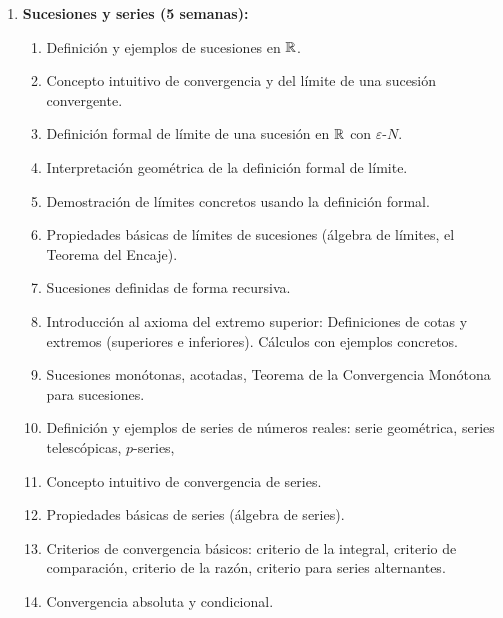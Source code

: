 \begin{refsection}
\begin{enumerate}
\item \textbf{Sucesiones y series (5 semanas):} 
\begin{enumerate}
    \item Definición y ejemplos de sucesiones en $\mathbb{R}$.
    \item Concepto intuitivo de convergencia y del límite de una sucesión convergente.
    \item Definición formal de límite de una sucesión en $\mathbb{R}$ con $\varepsilon$-$N$.
    \item Interpretación geométrica de la definición formal de límite.
    \item Demostración de límites concretos usando la definición formal.
    \item Propiedades básicas de límites de sucesiones (álgebra de límites, el Teorema del Encaje).
    \item Sucesiones definidas de forma recursiva.
    \item Introducción al axioma del extremo superior: Definiciones de cotas y extremos (superiores e inferiores). Cálculos con ejemplos concretos.
    \item Sucesiones monótonas, acotadas, Teorema de la Convergencia Monótona para sucesiones.
    \item Definición y ejemplos de series de números reales: serie geométrica, series telescópicas, $p$-series, 
    \item Concepto intuitivo de convergencia de series.
    \item Propiedades básicas de series (álgebra de series).
    \item Criterios de convergencia básicos: criterio de la integral, criterio de comparación, criterio de la razón, criterio para series alternantes.
    \item Convergencia absoluta y condicional.
\end{enumerate}



\end{enumerate}
\end{refsection}
